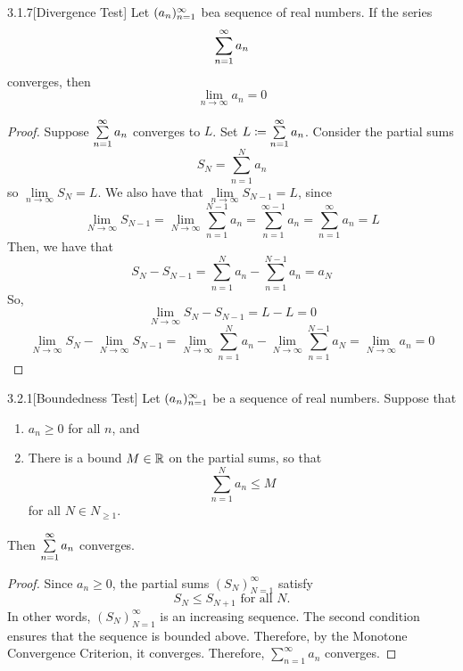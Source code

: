 \documentclass[openany]{report}
\begin{document}
\begin{manualprop}{3.1.7}[Divergence Test]
    Let $({a}_n)_{n=1}^\infty$ bea sequence of real numbers. If the series
    \[\sum\limits_{n=1}^\infty a_n\]
    converges, then
    \[\lim_{n\rightarrow\infty} a_n = 0\]
\end{manualprop}
\begin{proof}
    Suppose $\sum\limits_{n=1}^\infty a_n$ converges to $L$. Set $L \coloneqq \sum\limits_{n=1}^\infty a_n$. Consider the partial sums
    \[S_N = \sum_{n=1}^N a_n\]
    so $\lim\limits_{n\rightarrow\infty}S_N = L$. We also have that $\lim\limits_{n\rightarrow\infty}S_{N-1} = L$, since 
    \[\lim_{N\rightarrow\infty} S_{N-1} = \lim_{N\rightarrow\infty} \sum_{n=1}^{N-1} a_n = \sum_{n=1}^{\infty-1} a_n = \sum_{n=1}^{\infty} a_n = L\]
    Then, we have that 
    \[S_N - S_{N-1} = \sum_{n=1}^N a_n - \sum_{n=1}^{N-1} a_n = a_N\]
    So, 
    \[\lim_{N\rightarrow \infty} S_N - S_{N-1} = L - L = 0\]
    \[\lim_{N\rightarrow \infty} S_N - \lim_{N\rightarrow\infty} S_{N-1} = \lim_{N\rightarrow \infty} \sum_{n=1}^N a_n - \lim_{N\rightarrow \infty} \sum_{n=1}^{N-1} a_N = \lim_{N\rightarrow \infty} a_n = 0\]
\end{proof}


\begin{manualprop}{3.2.1}[Boundedness Test]
    Let $({a}_n)_{n=1}^\infty$ be a sequence of real numbers. Suppose that
    \begin{enumerate}[label=(\roman*)]
        \item $a_n \geq 0$ for all $n$, and
        \item There is a bound $M \in \mathbb{R}$ on the partial sums, so that
        \[\sum_{n=1}^N a_n \leq M\]
        for all $N \in N_{\geq 1}$.
    \end{enumerate}
    Then $\sum\limits_{n=1}^\infty a_n$ converges.
\end{manualprop}
\begin{proof}
    Since $a_n \geq 0$, the partial sums $(S_N)_{N=1}^\infty$ satisfy
    \[S_N \leq S_{N+1} \text{ for all $N$.}\]
    In other words, $(S_N)^\infty_{N=1}$ is an increasing sequence. The second condition ensures that the sequence is bounded above. Therefore, by the Monotone Convergence Criterion, it converges. Therefore, $\sum\limits_{n=1}^\infty a_n$ converges.
\end{proof}
\end{document}
